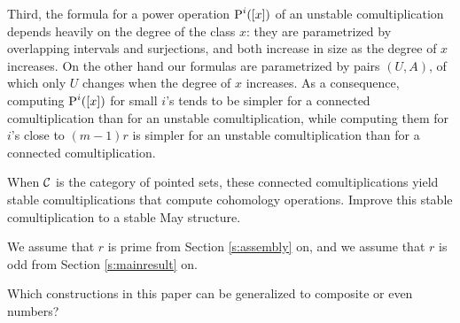 Third, the formula for a power operation $\operatorname{P}^i([x])$ of an unstable comultiplication depends heavily on the degree of the class $x$: they are parametrized by overlapping intervals and surjections, and both increase in size as the degree of $x$ increases. On the other hand our formulas are parametrized by pairs $(U,A)$, of which only $U$ changes when the degree of $x$ increases. As a consequence, computing $\operatorname{P}^i([x])$ for small $i$'s tends to be simpler for a connected comultiplication than for an unstable comultiplication, while computing them for $i$'s close to $(m-1)r$ is simpler for an unstable comultiplication than for a connected comultiplication.
\begin{question}
	When $\mathcal{C}$ is the category of pointed sets, these connected comultiplications yield stable comultiplications that compute cohomology operations. Improve this stable comultiplication to a stable May structure.
\end{question}
We assume that $r$ is prime from Section \ref{s:assembly} on, and we assume that $r$ is odd from Section \ref{s:mainresult} on.
\begin{question}
	Which constructions in this paper can be generalized to composite or even numbers?
\end{question}



